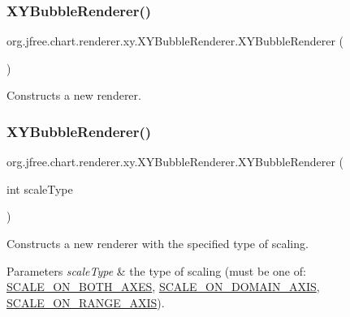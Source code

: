 \subsubsection{\texorpdfstring{X\+Y\+Bubble\+Renderer()}{XYBubbleRenderer()}\hspace{0.1cm}{\footnotesize\ttfamily [1/2]}}
{\footnotesize\ttfamily org.\+jfree.\+chart.\+renderer.\+xy.\+X\+Y\+Bubble\+Renderer.\+X\+Y\+Bubble\+Renderer (\begin{DoxyParamCaption}{ }\end{DoxyParamCaption})}

Constructs a new renderer. \mbox{\label{classorg_1_1jfree_1_1chart_1_1renderer_1_1xy_1_1_x_y_bubble_renderer_ac7a4c2b1d62ba09cd20fb7db9466316f}} 
\subsubsection{\texorpdfstring{X\+Y\+Bubble\+Renderer()}{XYBubbleRenderer()}\hspace{0.1cm}{\footnotesize\ttfamily [2/2]}}
{\footnotesize\ttfamily org.\+jfree.\+chart.\+renderer.\+xy.\+X\+Y\+Bubble\+Renderer.\+X\+Y\+Bubble\+Renderer (\begin{DoxyParamCaption}\item[{int}]{scale\+Type }\end{DoxyParamCaption})}

Constructs a new renderer with the specified type of scaling.


\begin{DoxyParams}{Parameters}
{\em scale\+Type} & the type of scaling (must be one of\+: \mbox{\hyperlink{classorg_1_1jfree_1_1chart_1_1renderer_1_1xy_1_1_x_y_bubble_renderer_a94cfe513a0749f72b57ef430f3590e7c}{S\+C\+A\+L\+E\+\_\+\+O\+N\+\_\+\+B\+O\+T\+H\+\_\+\+A\+X\+ES}}, \mbox{\hyperlink{classorg_1_1jfree_1_1chart_1_1renderer_1_1xy_1_1_x_y_bubble_renderer_a8be600dc688e3ecf53ce329739f4c39e}{S\+C\+A\+L\+E\+\_\+\+O\+N\+\_\+\+D\+O\+M\+A\+I\+N\+\_\+\+A\+X\+IS}}, \mbox{\hyperlink{classorg_1_1jfree_1_1chart_1_1renderer_1_1xy_1_1_x_y_bubble_renderer_a805e0d852a3e892741398e48df4ba9fb}{S\+C\+A\+L\+E\+\_\+\+O\+N\+\_\+\+R\+A\+N\+G\+E\+\_\+\+A\+X\+IS}}). \\
\hline
\end{DoxyParams}


